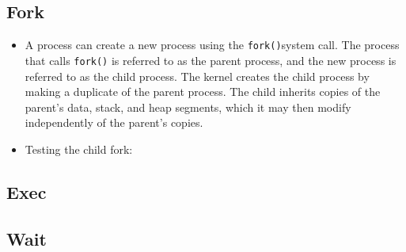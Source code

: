 \documentclass[]{article}
\newenvironment{Shaded}{}{}
\newcommand{\DataTypeTok}[1]{\textcolor[rgb]{0.56,0.13,0.00}{#1}}
\newcommand{\DecValTok}[1]{\textcolor[rgb]{0.25,0.63,0.44}{#1}}
\newcommand{\SpecialCharTok}[1]{\textcolor[rgb]{0.25,0.44,0.63}{#1}}
\newcommand{\StringTok}[1]{\textcolor[rgb]{0.25,0.44,0.63}{#1}}
\newcommand{\ControlFlowTok}[1]{\textcolor[rgb]{0.00,0.44,0.13}{\textbf{#1}}}
\newcommand{\NormalTok}[1]{#1}
\begin{document}
\subsection{\texorpdfstring{\textbf{Fork}}{Fork}}\label{header-n185}

\begin{itemize}
\item
  A process can create a new process using the \texttt{fork()}system
  call. The process that calls \texttt{fork()} is referred to as the
  parent process, and the new process is referred to as the child
  process. The kernel creates the child process by making a duplicate of
  the parent process. The child inherits copies of the parent's data,
  stack, and heap segments, which it may then modify independently of
  the parent's copies. 
\item
  Testing the child fork:

\begin{Shaded}
\end{Shaded}
\end{itemize}

\subsection{\texorpdfstring{\textbf{Exec}}{Exec}}\label{header-n193}

\subsection{\texorpdfstring{\textbf{Wait}}{Wait}}\label{header-n195}
\end{document}
